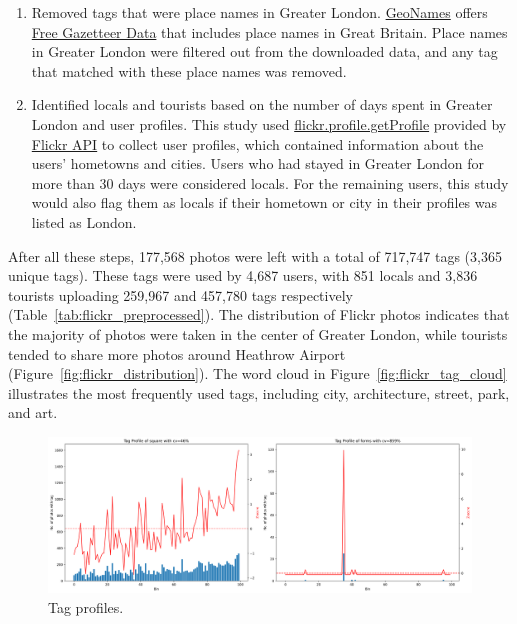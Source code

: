\documentclass{article}
\begin{document}
\begin{enumerate}
    \item Removed tags that were place names in Greater London. \href{http://www.geonames.org/}{GeoNames} offers \href{http://download.geonames.org/export/dump/}{Free Gazetteer Data} that includes place names in Great Britain. Place names in Greater London were filtered out from the downloaded data, and any tag that matched with these place names was removed.
    \item Identified locals and tourists based on the number of days spent in Greater London and user profiles. This study used \href{https://www.flickr.com/services/api/flickr.profile.getProfile.html}{flickr.profile.getProfile} provided by \href{https://www.flickr.com/services/api/}{Flickr API} to collect user profiles, which contained information about the users' hometowns and cities. Users who had stayed in Greater London for more than 30 days were considered locals. For the remaining users, this study would also flag them as locals if their hometown or city in their profiles was listed as London.
\end{enumerate}

After all these steps, 177,568 photos were left with a total of 717,747 tags (3,365 unique tags). These tags were used by 4,687 users, with 851 locals and 3,836 tourists uploading 259,967 and 457,780 tags respectively (Table~\ref{tab:flickr_preprocessed}). The distribution of Flickr photos indicates that the majority of photos were taken in the center of Greater London, while tourists tended to share more photos around Heathrow Airport (Figure~\ref{fig:flickr_distribution}). The word cloud in Figure~\ref{fig:flickr_tag_cloud} illustrates the most frequently used tags, including city, architecture, street, park, and art.



\begin{figure}
\centering
\includegraphics[width=1\textwidth]{figures/flickr_tags_cv.png}
\caption{\label{fig:flickr_tags_cv}Tag profiles.}
\end{figure}
\end{document}
